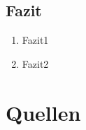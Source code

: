 \documentclass{beamer}
\begin{document}
\subsection{Fazit}
\begin{frame}
\begin{enumerate}
\item Fazit1
\item Fazit2
\end{enumerate}
\end{frame}

\section{Quellen}
\begin{frame}

\end{frame}
\end{document}
